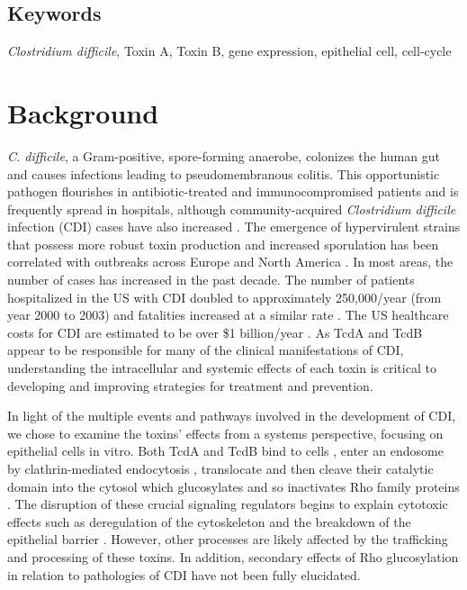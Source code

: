 \subsection{Keywords}
\textit{Clostridium difficile}, Toxin A, Toxin B, gene 
expression, epithelial cell, cell-cycle

\section{Background}
\textit{C. difficile}, a Gram-positive, spore-forming 
anaerobe, colonizes the human gut and causes infections 
leading to pseudomembranous colitis.  This opportunistic 
pathogen flourishes in antibiotic-treated and immunocompromised 
patients and is frequently spread in hospitals, although 
community-acquired \textit{Clostridium difficile} 
infection (CDI) cases have also increased \cite{Freeman:2010bv}. 
The emergence of hypervirulent strains that possess more 
robust toxin production and increased sporulation has been 
correlated with outbreaks across Europe and North 
America \cite{Warny:2005kd}. In most areas, the number 
of cases has increased in the past decade. The number 
of patients hospitalized in the US with CDI doubled to 
approximately 250,000/year (from year 2000 to 2003) and 
fatalities increased at a similar rate \cite{Zilberberg:2008gd}. 
The US healthcare costs for CDI are estimated to be over \$1 
billion/year \cite{Dubberke:2009ic}. As TcdA and TcdB appear 
to be responsible for many of the clinical manifestations of 
CDI, understanding the intracellular and systemic effects 
of each toxin is critical to developing and improving strategies 
for treatment and prevention.

In light of the multiple events and pathways involved in 
the development of CDI, we chose to examine the toxins' 
effects from a systems perspective, focusing on epithelial 
cells in vitro. Both TcdA and TcdB bind to 
cells \cite{Frisch:2003jo}, enter an endosome by clathrin-mediated 
endocytosis \cite{Papatheodorou:2010io}, translocate and then 
cleave their catalytic domain into the cytosol which 
glucosylates and so inactivates Rho family 
proteins \cite{Egerer:2007fy}. The disruption of these crucial 
signaling regulators begins to explain cytotoxic effects 
such as deregulation of the cytoskeleton and the breakdown 
of the epithelial barrier \cite{Nusrat:2001cs}. However, 
other processes are likely affected by the trafficking 
and processing of these toxins. In addition, secondary 
effects of Rho glucosylation in relation to pathologies 
of CDI have not been fully elucidated.

